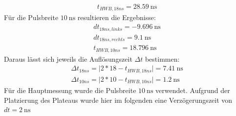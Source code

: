 \begin{tabular}
\begin{tabular}
\begin{gather}
t_{HWB,18ns}=\SI{28,59}{\nano\second} 
\end{gather}
Für die Pulsbreite $\SI{10}{\nano\second}$ resultieren die Ergebnisse:
\begin{gather}
dt_{18ns,links}=\SI{-9,696}{\nano\second} \\
dt_{18ns,rechts}=\SI{9,1}{\nano\second} \\
t_{HWB,10ns}=\SI{18,796}{\nano\second} 
\end{gather}
Daraus lässt sich jeweils die Auflösungszeit $\Delta t$ bestimmen:
\begin{gather}
\Delta t_{18ns}=\lvert2*18-t_{HWB,18ns}\rvert=\SI{7,41}{\nano\second} \\
\Delta t_{10ns}=\lvert2*10-t_{HWB,10ns}\rvert=\SI{1,2}{\nano\second}
\end{gather}
Für die Hauptmessung wurde die Pulsbreite $\SI{10}{\nano\second}$ verwendet. Aufgrund der Platzierung des Plateaus wurde hier im folgenden eine Verzögerungszeit von $dt=\SI{2}{\nano\second}$ 

\end{tabular}
\end{tabular}
